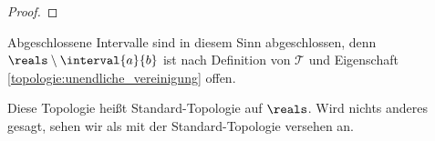 \begin{beispiele}
\begin{enumerate}
\begin{proof}
            
        \end{proof}
        Abgeschlossene Intervalle sind in diesem Sinn abgeschlossen, denn \( \reals\setminus \interval{a}{b} \) ist nach Definition von \( \mathcal{T} \) und Eigenschaft \ref{topologie:unendliche_vereinigung} offen.

        Diese Topologie heißt Standard-Topologie auf \( \reals \). 
        Wird nichts anderes gesagt, sehen wir \reals als mit der Standard-Topologie versehen an.
    \end{enumerate}
\end{beispiele}
\begin{definition}
    
\end{definition}
